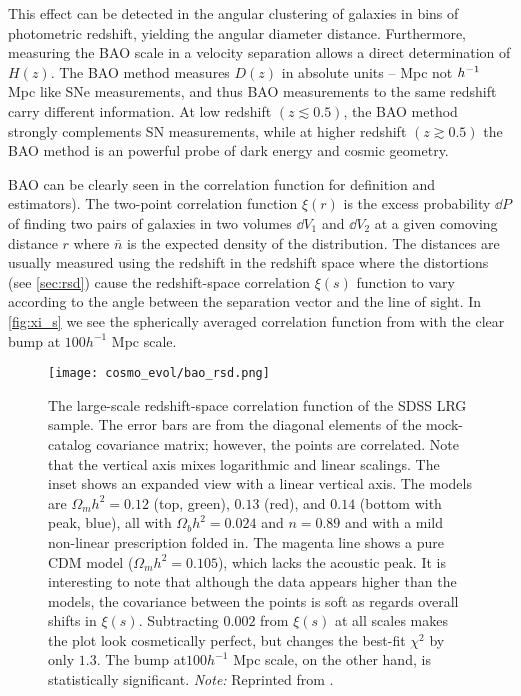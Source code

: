 This effect can be detected in the angular clustering of galaxies in bins of photometric redshift, yielding the angular diameter distance. Furthermore, measuring the BAO scale in a velocity separation allows a direct determination of $H(z)$. The BAO method measures $D(z)$ in absolute units -- Mpc not $h^{-1}$ Mpc like SNe measurements, and thus BAO measurements to the same redshift carry different information. At low redshift $(z\lesssim0.5)$, the BAO method strongly complements SN measurements, while at higher redshift $(z\gtrsim0.5)$ the BAO method is an powerful probe of dark energy and cosmic geometry.

BAO can be clearly seen in the correlation function \parencite[see e.g.][]{1993ApJ...412...64L} for definition and estimators). The two-point correlation function $\xi(r)$ is the excess probability $\dd P$ of finding two pairs of galaxies in two volumes $\dd V_1$ and $\dd V_2$ at a given comoving distance $r$
where $\bar{n}$ is the expected density of the distribution. The distances are usually measured using the redshift in the redshift space where the distortions (see \autoref{sec:rsd}) cause the redshift-space correlation $\xi(s)$ function to vary according to the angle between the separation vector and the line of sight. In \autoref{fig:xi_s} we see the spherically averaged correlation function from \textcite{2005ApJ...633..560E} with the clear bump at $100h^{-1}$ Mpc scale.
\begin{figure}[hbt]
    \centering
    \texttt{[image: cosmo\_evol/bao\_rsd.png]}
    \caption{The large-scale redshift-space correlation function of the SDSS LRG sample. The error bars are from the diagonal elements of the mock-catalog covariance matrix; however, the points are correlated. Note that the vertical axis mixes logarithmic and linear scalings. The inset shows an expanded view with a linear vertical axis. The models are $\Omega_mh^2=0.12$ (top, green), $0.13$ (red), and $0.14$ (bottom with peak, blue), all with $\Omega_bh^2=0.024$ and $n=0.89$ and with a mild non-linear prescription folded in. The magenta line shows a pure CDM model ($\Omega_mh^2=0.105$), which lacks the acoustic peak. It is interesting to note that although the data appears higher than the models, the covariance between the points is soft as regards overall shifts in $\xi(s)$. Subtracting $0.002$ from $\xi(s)$ at all scales makes the plot look cosmetically perfect, but changes the best-fit $\chi^2$ by only $1.3$. The bump at$100h^{-1}$ Mpc scale, on the other hand, is statistically significant. \textit{Note:} Reprinted from \textcite{2005ApJ...633..560E}.}
    \label{fig:xi_s}
\end{figure}

